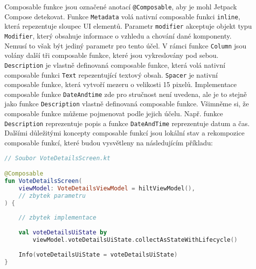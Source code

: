 \noindent Composable funkce jsou označené anotací \lstinline|@Composable|, aby je mohl Jetpack Compose detekovat. Funkce \lstinline|Metadata| volá nativní composable funkci \lstinline|inline|, která repezentuje sloupec UI elementů. Parametr \lstinline|modifier| akceptuje objekt typu \lstinline|Modifier|, který obsahuje informace o vzhledu a chování dané komponenty. Nemusí to však být jediný parametr pro tento účel. V rámci funkce \lstinline|Column| jsou volány další tři composable funkce, které jsou vykreslovány pod sebou. \lstinline|Description| je vlastně definovaná composable funkce, která volá nativní composable funkci \lstinline|Text| repezentující textový obsah. \lstinline|Spacer| je nativní composable funkce, která vytvoří mezeru o velikosti 15 pixelů. Implementace composable funkce \lstinline|DateAndtime| zde pro stručnost není uvedena, ale je to stejně jako funkce \lstinline|Description| vlastně definovaná composable funkce. Všimněme si, že composable funkce můžeme pojmenovat podle jejich účelu. Např. funkce \lstinline|Description| reprezentuje popis a funkce \lstinline|DateAndTime| reprezentuje datum a čas. Dalšími důležitými koncepty composable funkcí jsou lokální stav a rekompozice composable funkcí, které budou vysvětleny na následujícím příkladu:

\newpage

\begin{lstlisting}[caption={Ukázka composable funkce}, label={lst:composable-example}, tabsize=2, language=Kotlin]
// Soubor VoteDetailsScreen.kt

@Composable
fun VoteDetailsScreen(
	viewModel: VoteDetailsViewModel = hiltViewModel(),
	// zbytek parametru
) {
	
	// zbytek implementace
	
	val voteDetailsUiState by 
		viewModel.voteDetailsUiState.collectAsStateWithLifecycle()
	
	Info(voteDetailsUiState = voteDetailsUiState)
}
\end{lstlisting}

